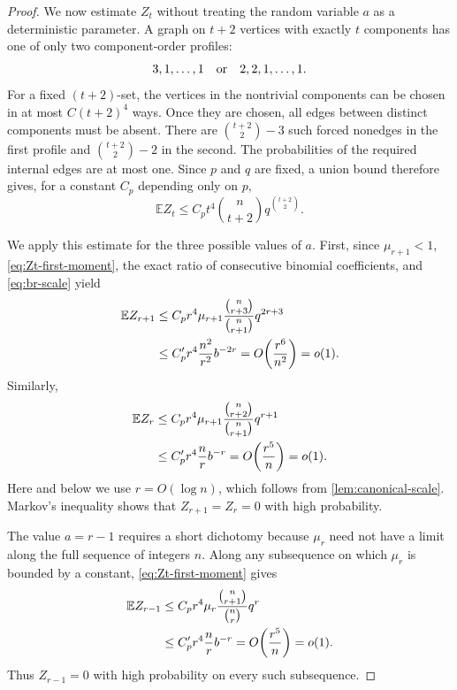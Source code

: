 \documentclass[11pt,reqno]{amsart}
\theoremstyle{definition}
\theoremstyle{remark}
\newcommand{\EE}{\mathbb E}
\begin{document}
\begin{proof}
We now estimate $Z_t$ without treating the random variable $a$ as a
deterministic parameter.  A graph on $t+2$ vertices with exactly $t$
components has one of only two component-order profiles:
\[
 3,1,\ldots,1
 \quad\hbox{or}\quad
 2,2,1,\ldots,1.
\]
For a fixed $(t+2)$-set, the vertices in the nontrivial components can be
chosen in at most $C(t+2)^4$ ways.  Once they are chosen, all edges between
distinct components must be absent.  There are
$\binom{t+2}{2}-3$ such forced nonedges in the first profile and
$\binom{t+2}{2}-2$ in the second.  The probabilities of the required
internal edges are at most one.  Since $p$ and $q$ are fixed, a union bound
therefore gives, for a constant $C_p$ depending only on $p$,
\begin{equation}\label{eq:Zt-first-moment}
 \EE Z_t\le
 C_p t^4\binom n{t+2}q^{\binom{t+2}{2}}.
\end{equation}

We apply this estimate for the three possible values of $a$.  First, since
$\mu_{r+1}<1$, \eqref{eq:Zt-first-moment}, the exact ratio of consecutive
binomial coefficients, and \eqref{eq:br-scale} yield
\begin{align}
 \EE Z_{r+1}
 &\le C_pr^4\mu_{r+1}
   \frac{\binom n{r+3}}{\binom n{r+1}}q^{2r+3}\notag\\
 &\le C'_pr^4\frac{n^2}{r^2}b^{-2r}
 =O\!\left(\frac{r^6}{n^2}\right)=o(1).
 \label{eq:Z-r-plus-one}
\end{align}
Similarly,
\begin{align}
 \EE Z_r
 &\le C_pr^4\mu_{r+1}
   \frac{\binom n{r+2}}{\binom n{r+1}}q^{r+1}\notag\\
 &\le C'_pr^4\frac nr b^{-r}
 =O\!\left(\frac{r^5}{n}\right)=o(1).
 \label{eq:Z-r}
\end{align}
Here and below we use $r=O(\log n)$, which follows from
\cref{lem:canonical-scale}.  Markov's inequality shows that
$Z_{r+1}=Z_r=0$ with high probability.

The value $a=r-1$ requires a short dichotomy because $\mu_r$ need not have
a limit along the full sequence of integers $n$.  Along any subsequence on
which $\mu_r$ is bounded by a constant, \eqref{eq:Zt-first-moment} gives
\begin{align}
 \EE Z_{r-1}
 &\le C_pr^4\mu_r
   \frac{\binom n{r+1}}{\binom nr}q^r\notag\\
 &\le C'_pr^4\frac nr b^{-r}
 =O\!\left(\frac{r^5}{n}\right)=o(1).
 \label{eq:Z-r-minus-one}
\end{align}
Thus $Z_{r-1}=0$ with high probability on every such subsequence.


\end{proof}
\end{document}
